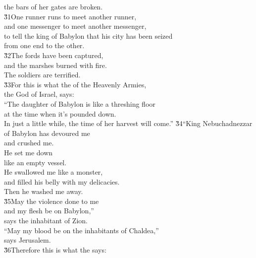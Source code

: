 \begin{poetry}
\poemll    the bars of her gates are broken. \\
\poeml \v{31}One runner runs to meet another runner, \\
\poemll    and one messenger to meet another messenger, \\
\poeml to tell the king of Babylon that his city has been seized \\
\poemll    from one end to the other. \\
\poeml \v{32}The fords have been captured, \\
\poemll    and the marshes burned with fire. \\
\poemlll       The soldiers are terrified. \\
\poeml \v{33}For this is what the  of the Heavenly Armies, \\
\poemll    the God of Israel, says: \\
\poeml ``The daughter of Babylon is like a threshing floor \\
\poemll    at the time when it's pounded down. \\
\poeml In just a little while, the time of her harvest will come.''
\poeml \v{34}``King Nebuchadnezzar of Babylon has devoured me \\
\poemll    and crushed me. \\
\poeml He set me down \\
\poemll    like an empty vessel. \\
\poeml He swallowed me like a monster, \\
\poemll    and filled his belly with my delicacies. \\
\poemlll       Then he washed me away. \\
\poeml \v{35}May the violence done to me \\
\poemll    and my flesh be on Babylon,'' \\
\poemlll       says the inhabitant of Zion. \\
\poeml ``May my blood be on the inhabitants of Chaldea,'' \\
\poemll    says Jerusalem. \\
\poeml \v{36}Therefore this is what the  says: \\

\end{poetry}
